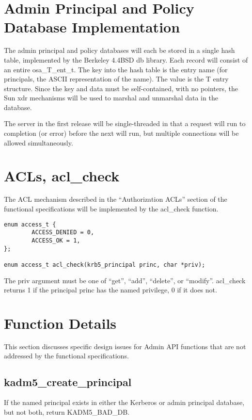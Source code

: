 \section{Admin Principal and Policy Database Implementation}

The admin principal and policy databases will each be stored in a
single hash table, implemented by the Berkeley 4.4BSD db library.
Each record will consist of an entire osa_T_ent_t.  The key into the
hash table is the entry name (for principals, the ASCII representation
of the name).  The value is the T entry structure.  Since the key and
data must be self-contained, with no pointers, the Sun xdr mechanisms
will be used to marshal and unmarshal data in the database.

The server in the first release will be single-threaded in that a
request will run to completion (or error) before the next will run,
but multiple connections will be allowed simultaneously.

\section{ACLs, acl_check}

The ACL mechanism described in the ``Authorization ACLs'' section of
the functional specifications will be implemented by the acl_check
function.

\begin{verbatim}
enum access_t {
        ACCESS_DENIED = 0,
        ACCESS_OK = 1,
};

enum access_t acl_check(krb5_principal princ, char *priv);
\end{verbatim}

The priv argument must be one of ``get'', ``add'', ``delete'', or
``modify''.  acl_check returns 1 if the principal princ has the named
privilege, 0 if it does not.

\section{Function Details}

This section discusses specific design issues for Admin API functions
that are not addressed by the functional specifications.

\subsection{kadm5_create_principal}

If the named principal exists in either the Kerberos or admin
principal database, but not both, return KADM5_BAD_DB.

